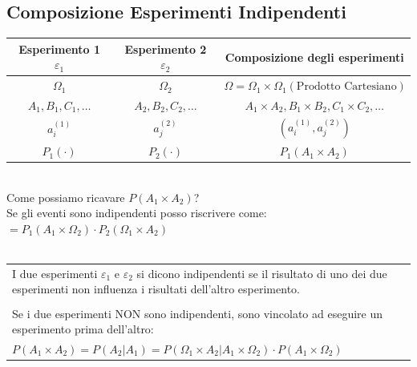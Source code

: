 \documentclass{article}
\begin{document}
\subsection{Composizione Esperimenti Indipendenti} 
\begin{table} [ht]
    \centering
    \begin{tabular}{|c|c|c|}
    \hline
        Esperimento 1 $\varepsilon_1$ & Esperimento 2 $\varepsilon_2$ & Composizione degli esperimenti \\
        \hline
        $\Omega_1$ & $\Omega_2$ & $\Omega = \Omega_1 \times \Omega_1 \left( \text{Prodotto Cartesiano} \right)$\\
        \hline
        $A_1,B_1,C_1, \dots$ & $A_2,B_2,C_2, \dots$ & $A_1 \times A_2, B_1 \times B_2, C_1 \times C_2, \dots$\\
        \hline
        $a_i^{(1)}$ & $a_j^{(2)}$ & $\left( a_i^{(1)} , a_j^{(2)} \right)$\\
        \hline
        $P_1(\cdot)$ & $P_2(\cdot)$ & $P_1(A_1 \times A_2)$\\
        \hline
    \end{tabular}
\end{table} ~\\
Come possiamo ricavare $P(A_1 \times A_2)$? \\
Se gli eventi sono indipendenti posso riscrivere come: $= P_1 \left(A_1 \times \Omega_2 \right) \cdot P_2\left( \Omega_1 \times A_2  \right) $ \\ \\
\begin{tabular}{|p{13cm}}
I due esperimenti $\varepsilon_1$ e $\varepsilon_2$ si dicono indipendenti se il risultato di uno dei due esperimenti non influenza i risultati dell’altro esperimento. \\ \\
Se i due esperimenti NON sono indipendenti, sono vincolato ad eseguire un esperimento prima dell’altro: \\
$P(A_1 \times A_2) = P(A_2 |A_1) = P \left(\Omega_1 \times A_2   \big|  A_1 \times \Omega_2  \right) \cdot P \left(A_1 \times \Omega_2\right)$
\end{tabular}
\end{document}
